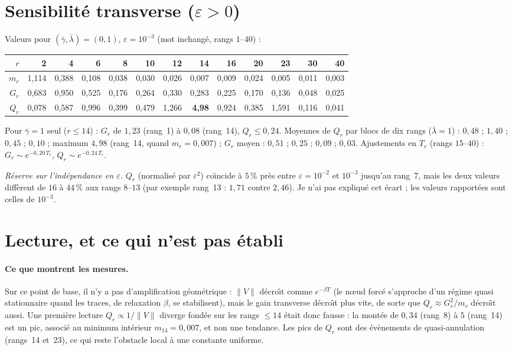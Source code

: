 \documentclass[11pt,a4paper]{article}
\theoremstyle{remark}
\newcommand{\norm}[1]{\lVert #1\rVert}
\begin{document}
\section{Sensibilit\'e transverse ($\varepsilon>0$)}
Valeurs pour $(\bar\gamma,\bar\lambda)=(0,1)$, $\varepsilon=10^{-3}$ (mot inchang\'e, rangs $1$--$40$) :
\begin{center}\small
\begin{tabular}{r|rrrrrrrrrrrr}
\toprule
$r$ & 2 & 4 & 6 & 8 & 10 & 12 & 14 & 16 & 20 & 23 & 30 & 40\\
\midrule
$m_r$ & 1,114 & 0,388 & 0,108 & 0,038 & 0,030 & 0,026 & 0,007 & 0,009 & 0,024 & 0,005 & 0,011 & 0,003\\
$G_r$ & 0,683 & 0,950 & 0,525 & 0,176 & 0,264 & 0,330 & 0,283 & 0,225 & 0,170 & 0,136 & 0,048 & 0,025\\
$Q_r$ & 0,078 & 0,587 & 0,996 & 0,399 & 0,479 & 1,266 & \textbf{4,98} & 0,924 & 0,385 & 1,591 & 0,116 & 0,041\\
\bottomrule
\end{tabular}
\end{center}
Pour $\bar\gamma=1$ seul ($r\le14$) : $G_r$ de $1{,}23$ (rang~1) \`a $0{,}08$ (rang~14), $Q_r\le0{,}24$. Moyennes de $Q_r$ par blocs de dix rangs ($\bar\lambda=1$) : $0{,}48$ ; $1{,}40$ ; $0{,}45$ ; $0{,}10$ ; maximum $4{,}98$ (rang~14, quand $m_r=0{,}007$) ; $G_r$ moyen : $0{,}51$ ; $0{,}25$ ; $0{,}09$ ; $0{,}03$. Ajustements en $T_r$ (rangs $15$--$40$) : $G_r\sim e^{-0{,}20\,T_r}$, $Q_r\sim e^{-0{,}24\,T_r}$.

\emph{R\'eserve sur l'ind\'ependance en $\varepsilon$.} $Q_r$ (normalis\'e par $\varepsilon^2$) co\"{\i}ncide \`a $5\,\%$ pr\`es entre $\varepsilon=10^{-2}$ et $10^{-3}$ jusqu'au rang~7, mais les deux valeurs diff\`erent de $16$ \`a $44\,\%$ aux rangs $8$--$13$ (par exemple rang~13 : $1{,}71$ contre $2{,}46$). Je n'ai pas expliqu\'e cet \'ecart ; les valeurs rapport\'ees sont celles de $10^{-3}$.

\section{Lecture, et ce qui n'est pas \'etabli}
\paragraph{Ce que montrent les mesures.} Sur ce point de base, il n'y a pas d'amplification g\'eom\'etrique : $\norm{V}$ d\'ecro\^{\i}t comme $e^{-\beta T}$ (le n\oe ud forc\'e s'approche d'un r\'egime quasi stationnaire quand les traces, de relaxation $\beta$, se stabilisent), mais le gain transverse d\'ecro\^{\i}t plus vite, de sorte que $Q_r\approx G_r^2/m_r$ d\'ecro\^{\i}t aussi. Une premi\`ere lecture \og $Q_r\propto1/\norm{V}$ diverge \fg{} fond\'ee sur les rangs $\le14$ \'etait donc fausse : la mont\'ee de $0{,}34$ (rang~8) \`a $5$ (rang~14) est un pic, associ\'e au minimum int\'erieur $m_{14}=0{,}007$, et non une tendance. Les pics de $Q_r$ sont des \'ev\`enements de quasi-annulation (rangs~14 et~23), ce qui reste l'obstacle local \`a une constante uniforme.
\end{document}
